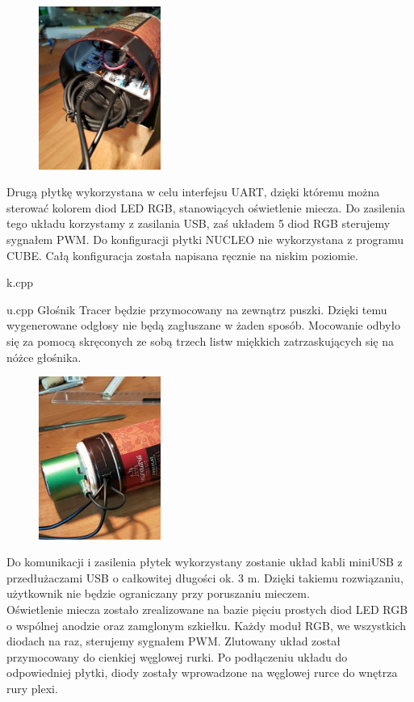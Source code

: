 \documentclass[10pt, a4paper]{article}
\begin{document}
		\begin{figure}[H]
	\centering
	\includegraphics[width=40mm]{21.jpg}
	\end{figure}
Drugą płytkę wykorzystana w celu interfejsu UART, dzięki któremu można sterować kolorem diod LED RGB, stanowiących oświetlenie miecza. Do zasilenia tego układu korzystamy z zasilania USB, zaś układem 5 diod RGB sterujemy sygnałem PWM. Do konfiguracji płytki NUCLEO nie wykorzystana z programu CUBE. Całą konfiguracja została napisana ręcznie na niskim poziomie. 

{k.cpp}

{u.cpp}
Głośnik Tracer będzie przymocowany na zewnątrz puszki. Dzięki temu wygenerowane odgłosy nie będą zagłuszane w żaden sposób. Mocowanie odbyło się za pomocą skręconych ze sobą trzech listw miękkich zatrzaskujących się na nóżce głośnika. \\
	\begin{figure}[H]
	\centering
	\includegraphics[width=40mm]{9.jpg}
	\end{figure}
Do komunikacji i zasilenia płytek wykorzystany zostanie układ kabli miniUSB z przedłużaczami USB o całkowitej długości ok. 3 m. Dzięki takiemu rozwiązaniu, użytkownik nie będzie ograniczany przy poruszaniu mieczem. \\
Oświetlenie miecza zostało zrealizowane na bazie pięciu prostych diod LED RGB o wspólnej anodzie oraz zamglonym szkiełku. Każdy moduł RGB, we wszystkich diodach na raz, sterujemy sygnałem PWM. Zlutowany układ został przymocowany do cienkiej węglowej rurki. Po podłączeniu układu do odpowiedniej płytki, diody zostały wprowadzone na węglowej rurce do wnętrza rury plexi. \\
\end{document}
